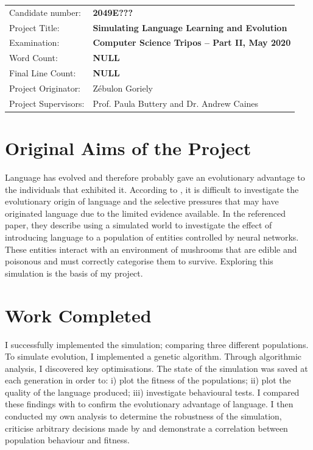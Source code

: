 \documentclass[12pt,a4paper]{report}
\begin{document}
{\large
\begin{tabular}{ll}
Candidate number:               & \bf 2049E???                       \\
Project Title:      & \bf Simulating Language Learning and Evolution \\
Examination:        & \bf Computer Science Tripos -- Part II, May 2020  \\
Word Count:         & \bf NULL\footnotemark[1]  \\
Final Line Count:         & \bf NULL\footnotemark[2]  \\
Project Originator: & Z\'ebulon Goriely                    \\
Project Supervisors:         & Prof. Paula Buttery and Dr. Andrew Caines                  \\ 
\end{tabular}
}

\section*{Original Aims of the Project}

Language has evolved and therefore probably gave an evolutionary advantage to the individuals that exhibited it. According to \citet{Cangelosi1998}, it is difficult to investigate the evolutionary origin of language and the selective pressures that may have originated language due to the limited evidence available. In the referenced paper, they describe using a simulated world to investigate the effect of introducing language to a population of entities controlled by neural networks. These entities interact with an environment of mushrooms that are edible and poisonous and must correctly categorise them to survive. Exploring this simulation is the basis of my project.

\section*{Work Completed}

I successfully implemented the simulation; comparing three different populations. To simulate evolution, I implemented a genetic algorithm. Through algorithmic analysis, I discovered key optimisations. The state of the simulation was saved at each generation in order to: i) plot the fitness of the populations; ii) plot the quality of the language produced; iii) investigate behavioural tests. I compared these findings with \citet{Cangelosi1998} to confirm the evolutionary advantage of language. I then conducted my own analysis to determine the robustness of the simulation, criticise arbitrary decisions made by \citet{Cangelosi1998} and demonstrate a correlation between population behaviour and fitness.
\end{document}
